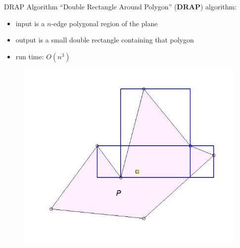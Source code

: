 \begin{frame}{DRAP Algorithm}
  ``Double Rectangle Around Polygon'' (\textbf{DRAP}) algorithm:\\
  \begin{itemize}
  \item input is a $n$-edge polygonal region of the plane
  \item output is a small double rectangle containing that polygon
  \item run time: $O(n^3)$
  \end{itemize}
  \begin{figure}
    \includegraphics[scale=0.3]{figs/drap4.jpg}
  \end{figure}
\end{frame}

